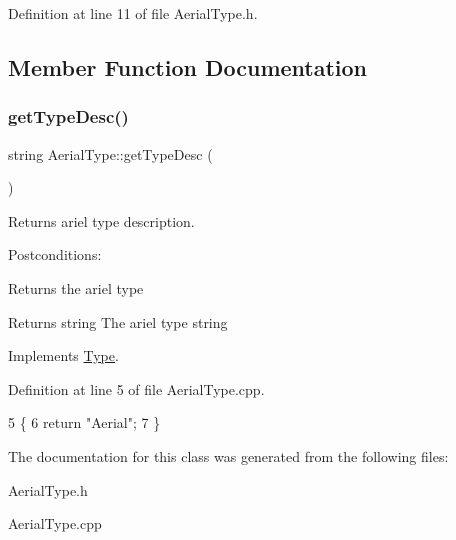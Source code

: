 Definition at line 11 of file Aerial\+Type.\+h.



\subsection{Member Function Documentation}
\mbox{\label{classAerialType_a66dd43f2688de9a5eab9c6de0396e9cc}} 
\subsubsection{\texorpdfstring{get\+Type\+Desc()}{getTypeDesc()}}
{\footnotesize\ttfamily string Aerial\+Type\+::get\+Type\+Desc (\begin{DoxyParamCaption}{ }\end{DoxyParamCaption})\hspace{0.3cm}{\ttfamily [virtual]}}



Returns ariel type description. 

Postconditions\+:
\begin{DoxyItemize}
\item Returns the ariel type
\end{DoxyItemize}

\begin{DoxyReturn}{Returns}
string The ariel type string 
\end{DoxyReturn}


Implements \hyperlink{classType}{Type}.



Definition at line 5 of file Aerial\+Type.\+cpp.


\begin{DoxyCode}
5                                \{
6     \textcolor{keywordflow}{return} \textcolor{stringliteral}{"Aerial"};
7 \}
\end{DoxyCode}


The documentation for this class was generated from the following files\+:\begin{DoxyCompactItemize}
\item 
Aerial\+Type.\+h\item 
Aerial\+Type.\+cpp\end{DoxyCompactItemize}
